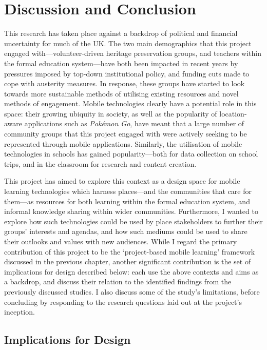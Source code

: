 \chapter{Discussion and Conclusion}
\label{chap:discussionConclusion}

This research has taken place against a backdrop of political and financial uncertainty for much of the UK. The two main demographics that this project engaged with---volunteer-driven heritage preservation groups, and teachers within the formal education system---have both been impacted in recent years by pressures imposed by top-down institutional policy, and funding cuts made to cope with austerity measures. In response, these groups have started to look towards more sustainable methods of utilising existing resources and novel methods of engagement. Mobile technologies clearly have a potential role in this space: their growing ubiquity in society, as well as the popularity of location-aware applications such as \textit{Pok\'emon Go}, have meant that a large number of community groups that this project engaged with were actively seeking to be represented through mobile applications. Similarly, the utilisation of mobile technologies in schools has gained popularity---both for data collection on school trips, and in the classroom for research and content creation.

This project has aimed to explore this context as a design space for mobile learning technologies which harness places---and the communities that care for them---as resources for both learning within the formal education system, and informal knowledge sharing within wider communities. Furthermore, I wanted to explore how such technologies could be used by place stakeholders to further their groups' interests and agendas, and how such mediums could be used to share their outlooks and values with new audiences. While I regard the primary contribution of this project to be the `project-based mobile learning' framework discussed in the previous chapter, another significant contribution is the set of implications for design described below: each use the above contexts and aims as a backdrop, and discuss their relation to the identified findings from the previously discussed studies. I also discuss some of the study's limitations, before concluding by responding to the research questions laid out at the project's inception.

\section{Implications for Design}

